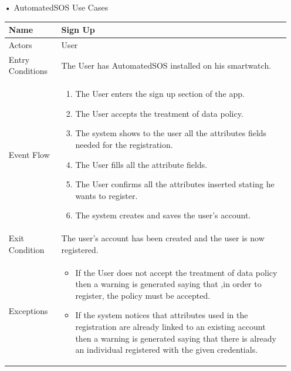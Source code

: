 \begin{enumerate}
\item[•]{\Large AutomatedSOS Use Cases}
\FloatBarrier
\begin{table}[h]
\begin{tabular}{|l|p{}|}
\hline
Name             & Sign Up \\ \hline
Actors           & User  \\ \hline
Entry Conditions & The User has AutomatedSOS installed on his smartwatch.    \\ \hline
Event Flow       & \begin{enumerate}
            \item The User enters the sign up section of the app.
            \item The User accepts the treatment of data policy.
            \item The system shows to the user all the attributes fields needed for the registration.
            \item The User fills all the attribute fields.
            \item The User confirms all the attributes inserted stating he wants to register.
            \item The system creates and saves the user's account.
        \end{enumerate}\\ \hline
Exit Condition   & The user's account has been created and the user is now registered.\\ \hline
Exceptions       & \begin{itemize}
\item If the User does not accept the treatment of data policy then a warning is generated saying that ,in order to register, the policy must be accepted.
\item If the system notices that attributes used in the registration are already linked to an existing account then a warning is generated saying that there is already an individual registered with the given credentials.
\end{itemize}\\ \hline
\end{tabular}
\end{table}
\FloatBarrier


\end{enumerate}
